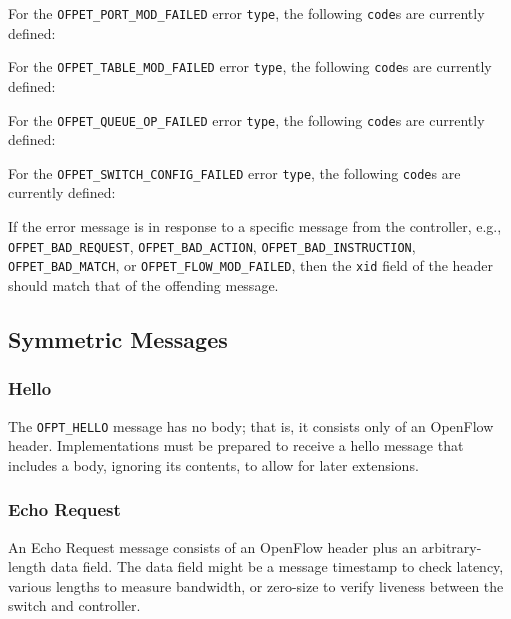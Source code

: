 For the \verb|OFPET_PORT_MOD_FAILED| error \verb|type|, the following \verb|code|s are currently defined:



For the \verb|OFPET_TABLE_MOD_FAILED| error \verb|type|, the following \verb|code|s are currently defined:



For the \verb|OFPET_QUEUE_OP_FAILED| error \verb|type|, the following \verb|code|s are currently defined:



For the \verb|OFPET_SWITCH_CONFIG_FAILED| error \verb|type|, the following \verb|code|s are currently defined:



If the error message is in response to a specific message from the controller, e.g., \verb|OFPET_BAD_REQUEST|, \verb|OFPET_BAD_ACTION|, \verb|OFPET_BAD_INSTRUCTION|, \verb|OFPET_BAD_MATCH|, or \verb|OFPET_FLOW_MOD_FAILED|, then the \verb|xid| field of the header should match that of the offending message.

\subsection{Symmetric Messages}
\subsubsection{Hello}
The \verb|OFPT_HELLO| message has no body; that is, it consists only of an OpenFlow header. Implementations must be prepared to receive a hello message that includes a body, ignoring its contents, to allow for later extensions. 

\subsubsection{Echo Request}
An Echo Request message consists of an OpenFlow header plus an arbitrary-length data field.  The data field might be a message timestamp to check latency, various lengths to measure bandwidth, or zero-size to verify liveness between the switch and controller.

